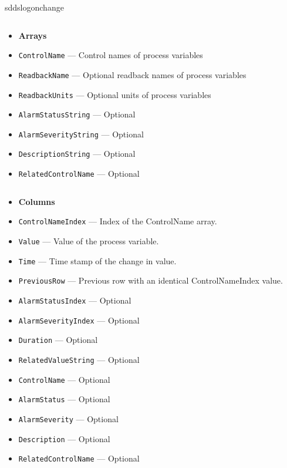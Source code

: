 \begin{sddsprog}{sddslogonchange}
\begin{itemize}
\begin{verbatim}
\end{verbatim}
\begin{itemize}
        \item {\bf Arrays}
        \item {\tt ControlName} --- Control names of process variables
        \item {\tt ReadbackName} --- Optional readback names of process variables
        \item {\tt ReadbackUnits} --- Optional units of process variables
        \item {\tt AlarmStatusString} --- Optional
        \item {\tt AlarmSeverityString} --- Optional
        \item {\tt DescriptionString} --- Optional
        \item {\tt RelatedControlName} --- Optional
\end{itemize}
\begin{verbatim}

\end{verbatim}
\begin{itemize}
        \item {\bf Columns}
        \item {\tt ControlNameIndex} --- Index of the ControlName array.
        \item {\tt Value} --- Value of the process variable.
        \item {\tt Time} --- Time stamp of the change in value.
        \item {\tt PreviousRow} --- Previous row with an identical ControlNameIndex value.
        \item {\tt AlarmStatusIndex} --- Optional
        \item {\tt AlarmSeverityIndex} --- Optional
        \item {\tt Duration} --- Optional
        \item {\tt RelatedValueString} --- Optional
        \item {\tt ControlName} --- Optional
        \item {\tt AlarmStatus} --- Optional
        \item {\tt AlarmSeverity} --- Optional
        \item {\tt Description} --- Optional
        \item {\tt RelatedControlName} --- Optional

\end{itemize}

\end{itemize}


\end{sddsprog}
